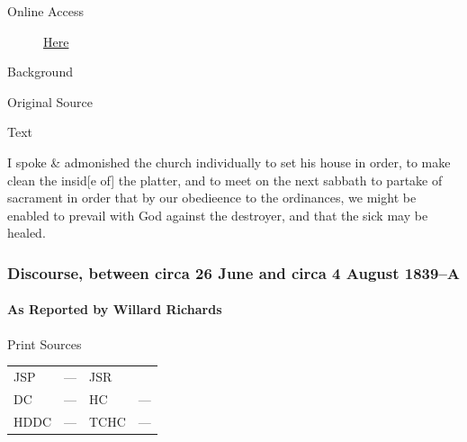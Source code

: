 				\begin{description}
					\item[Online Access] \href{https://www.josephsmithpapers.org/paper-summary/discourse-28-july-1839-as-reported-by-james-mulholland/1}{Here}
				\end{description}
				
				\begin{description}
					\item[Background]
				\end{description}
				
				
				\begin{description}
					\item[Original Source]
				\end{description}
				
				
				\begin{description}
					\item[Text]
				\end{description}
				
					I spoke \& admonished the church individually to set his house in order, to make clean the insid[e of] the platter, and to meet on the next sabbath to partake of sacrament in order that by our obedieence to the ordinances, we might be enabled to prevail with God against the destroyer, and that the sick may be healed.
					
		\subsubsection{Discourse, between circa 26 June and circa 4 August 1839--A}
			\label{EMS-1839-JS-CIR-26-JUN-CIR-4-AUG-1839-A}
			
			\paragraph{As Reported by Willard Richards}
				\label{EMS-1839-JS-CIR-26-JUN-CIR-4-AUG-1839-A-WR}
				
				\begin{description}
					\item[Print Sources]
				\end{description}

					\begin{tabular}{p{0.5in}p{1in}p{0.5in}p{1in}}
					JSP	 	& ---		& JSR 		&  \\
					DC	 	& ---		& HC 		& --- \\
					HDDC 	& ---		& TCHC 		& --- \\
					\end{tabular}
				
